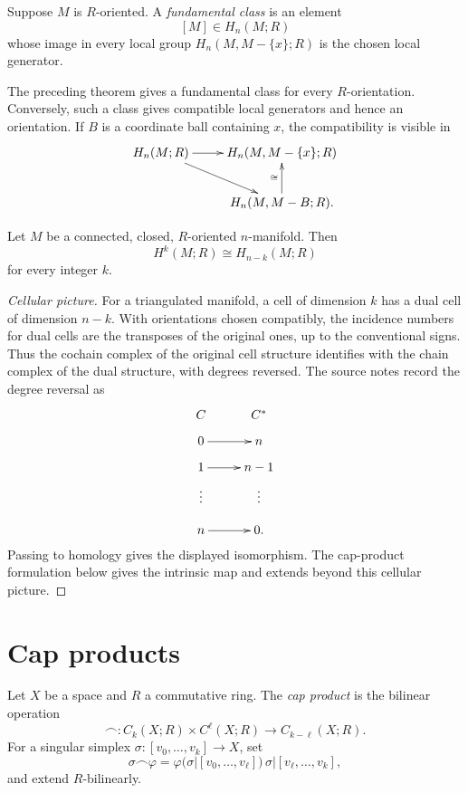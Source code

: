 \begin{definition}
\label{at-definition-fundamental-class}
Suppose $M$ is $R$-oriented.  A
\emph{fundamental class} is an element
$$
[M]\in H_n(M;R)
$$
whose image in every local group
$H_n(M,M-\{x\};R)$ is the chosen local
generator.
\end{definition}

\noindent
The preceding theorem gives a fundamental
class for every $R$-orientation.  Conversely,
such a class gives compatible local
generators and hence an orientation.  If
$B$ is a coordinate ball containing $x$,
the compatibility is visible in
$$
\xymatrix{
H_n(M;R)
  \ar[r]\ar[dr]
  &H_n(M,M-\{x\};R) \\
&H_n(M,M-B;R)\ar[u]^\cong.
}
$$

\begin{theorem}
\label{at-theorem-poincare-ring}
Let $M$ be a connected, closed,
$R$-oriented $n$-manifold.  Then
$$
H^k(M;R)\cong H_{n-k}(M;R)
$$
for every integer $k$.
\end{theorem}

\begin{proof}[Cellular picture]
For a triangulated manifold, a cell of
dimension $k$ has a dual cell of dimension
$n-k$.  With orientations chosen
compatibly, the incidence numbers for dual
cells are the transposes of the original
ones, up to the conventional signs.  Thus
the cochain complex of the original cell
structure identifies with the chain
complex of the dual structure, with degrees
reversed.  The source notes record the
degree reversal as
$$
\xymatrix@R=.8em{
C&C^* \\
0\ar[r]&n \\
1\ar[r]&n-1 \\
\vdots&\vdots \\
n\ar[r]&0.
}
$$
Passing to homology gives the displayed
isomorphism.  The cap-product formulation
below gives the intrinsic map and extends
beyond this cellular picture.
\end{proof}
\section{Cap products}
\label{section-cap-products}

\begin{definition}
\label{at-definition-cap-product}
Let $X$ be a space and $R$ a commutative
ring.  The \emph{cap product} is the
bilinear operation
$$
\frown:
C_k(X;R)\times C^\ell(X;R)
\longrightarrow C_{k-\ell}(X;R).
$$
For a singular simplex
$\sigma:[v_0,\ldots,v_k]\to X$, set
$$
\sigma\frown\varphi
=
\varphi
(\sigma|[v_0,\ldots,v_\ell])
\,\sigma|[v_\ell,\ldots,v_k],
$$
and extend $R$-bilinearly.
\end{definition}


